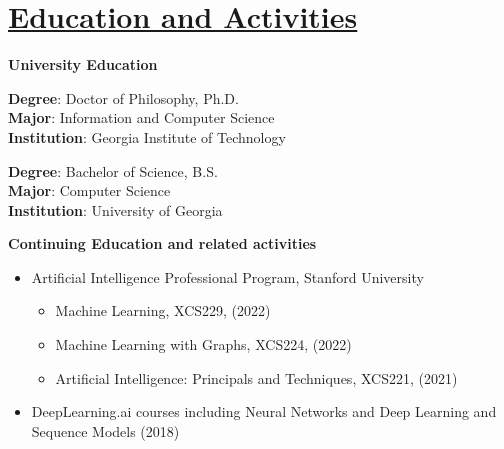 \documentclass[
]{article}
\providecommand{\tightlist}{%
  \setlength{\itemsep}{0pt}\setlength{\parskip}{0pt}}
\begin{document}
\hypertarget{education-and-activities}{
\section{\texorpdfstring{\underline{\textbf{Education and
Activities}}}{Education and Activities}}\label{education-and-activities}}

\hypertarget{university-education}{%
{\large \textbf{University Education}}\label{university-education}}

\textbf{Degree}: Doctor of Philosophy,  Ph.D.\\
\textbf{Major}: Information and Computer Science \\
\textbf{Institution}: Georgia Institute of Technology\\
\vspace{0.1in}

\textbf{Degree}: Bachelor of Science, B.S. \\
\textbf{Major}: Computer Science \\
\textbf{Institution}: University of Georgia

\hypertarget{continuing-education-and-related-activities}{%
{\large \textbf{Continuing Education and related
activities}}
\label{continuing-education-and-related-activities}}

\begin{itemize}
\tightlist
\item
  Artificial Intelligence Professional Program, Stanford University

  \begin{itemize}
  \tightlist
  \item
    Machine Learning, XCS229, (2022)
  \item
    Machine Learning with Graphs, XCS224, (2022)
  \item
    Artificial Intelligence: Principals and Techniques, XCS221, (2021)
  \end{itemize}
\item
  DeepLearning.ai courses including Neural Networks and Deep Learning
  and Sequence Models (2018)
\end{itemize}
\end{document}
